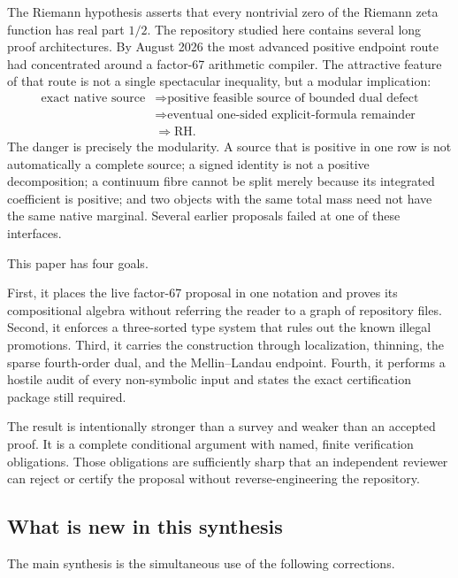 \documentclass[11pt]{article}
\theoremstyle{definition}
\theoremstyle{remark}
\newcommand{\RH}{\mathrm{RH}}
\newcommand{\1}{\mathbf 1}
\begin{document}
The Riemann hypothesis asserts that every nontrivial zero of the Riemann zeta function has real part \(1/2\).  The repository studied here contains several long proof architectures.  By August 2026 the most advanced positive endpoint route had concentrated around a factor-67 arithmetic compiler.  The attractive feature of that route is not a single spectacular inequality, but a modular implication:
\[
\begin{aligned}
\text{exact native source}
&\Longrightarrow \text{positive feasible source of bounded dual defect}\\
&\Longrightarrow \text{eventual one-sided explicit-formula remainder}\\
&\Longrightarrow \RH.
\end{aligned}
\]
The danger is precisely the modularity.  A source that is positive in one row is not automatically a complete source; a signed identity is not a positive decomposition; a continuum fibre cannot be split merely because its integrated coefficient is positive; and two objects with the same total mass need not have the same native marginal.  Several earlier proposals failed at one of these interfaces.

This paper has four goals.

First, it places the live factor-67 proposal in one notation and proves its compositional algebra without referring the reader to a graph of repository files.  Second, it enforces a three-sorted type system that rules out the known illegal promotions.  Third, it carries the construction through localization, thinning, the sparse fourth-order dual, and the Mellin--Landau endpoint.  Fourth, it performs a hostile audit of every non-symbolic input and states the exact certification package still required.

The result is intentionally stronger than a survey and weaker than an accepted proof.  It is a complete conditional argument with named, finite verification obligations.  Those obligations are sufficiently sharp that an independent reviewer can reject or certify the proposal without reverse-engineering the repository.

\subsection{What is new in this synthesis}

The main synthesis is the simultaneous use of the following corrections.
\end{document}
